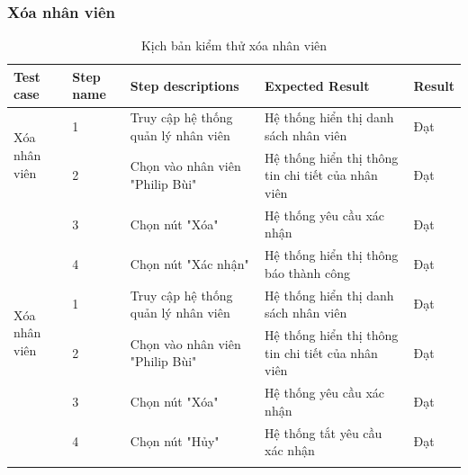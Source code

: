 \subsubsection{Xóa nhân viên}
{
    \setlength\extrarowheight{6pt}
    \begin{longtable}{| p{2.5cm}| p{1cm}| p{5.5cm}| p{4.5cm} | p{1.5cm} |}
        \hline
        \textbf{Test case}                    & \textbf{Step name} & \textbf{Step descriptions}          & \textbf{Expected Result}                           & \textbf{Result} \\
        \hline
        \multirow[t]{2}{2.5cm}{Xóa nhân viên} & 1                  & Truy cập hệ thống quản lý nhân viên & Hệ thống hiển thị danh sách nhân viên              & Đạt             \\
        \cline{2-5}
                                              & 2                  & Chọn vào nhân viên "Philip Bùi"     & Hệ thống hiển thị thông tin chi tiết của nhân viên & Đạt             \\
        \cline{2-5}
                                              & 3                  & Chọn nút "Xóa"                      & Hệ thống yêu cầu xác nhận                          & Đạt             \\
        \cline{2-5}
                                              & 4                  & Chọn nút "Xác nhận"                 & Hệ thống hiển thị thông báo thành công             & Đạt             \\
        \hline
        \multirow[t]{2}{2.5cm}{Xóa nhân viên} & 1                  & Truy cập hệ thống quản lý nhân viên & Hệ thống hiển thị danh sách nhân viên              & Đạt             \\
        \cline{2-5}
                                              & 2                  & Chọn vào nhân viên "Philip Bùi"     & Hệ thống hiển thị thông tin chi tiết của nhân viên & Đạt             \\
        \cline{2-5}
                                              & 3                  & Chọn nút "Xóa"                      & Hệ thống yêu cầu xác nhận                          & Đạt             \\
        \cline{2-5}
                                              & 4                  & Chọn nút "Hủy"                      & Hệ thống tắt yêu cầu xác nhận                      & Đạt             \\
        \hline
        \caption{Kịch bản kiểm thử xóa nhân viên}
    \end{longtable}
}

